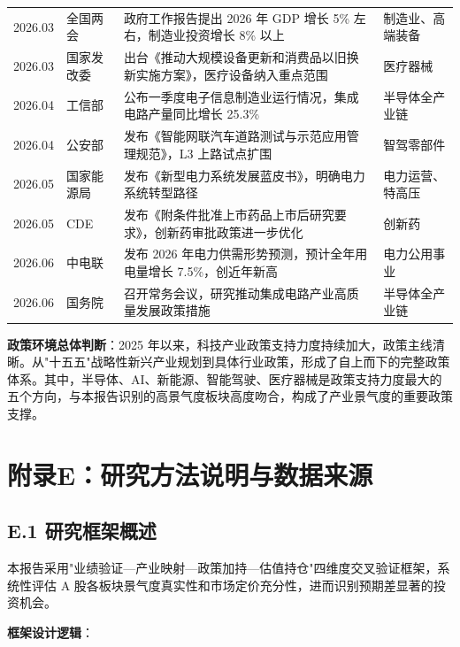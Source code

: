 \begin{exhibitbox}[表 D-1：重点产业政策与关键事件时间轴]
\begin{tabularx}{\textwidth}{@{}l l X l@{}}
2026.03 & 全国两会 & 政府工作报告提出 2026 年 GDP 增长 5\% 左右，制造业投资增长 8\% 以上 & 制造业、高端装备 \\
2026.03 & 国家发改委 & 出台《推动大规模设备更新和消费品以旧换新实施方案》，医疗设备纳入重点范围 & 医疗器械 \\
2026.04 & 工信部 & 公布一季度电子信息制造业运行情况，集成电路产量同比增长 25.3\% & 半导体全产业链 \\
2026.04 & 公安部 & 发布《智能网联汽车道路测试与示范应用管理规范》，L3 上路试点扩围 & 智驾零部件 \\
2026.05 & 国家能源局 & 发布《新型电力系统发展蓝皮书》，明确电力系统转型路径 & 电力运营、特高压 \\
2026.05 & CDE & 发布《附条件批准上市药品上市后研究要求》，创新药审批政策进一步优化 & 创新药 \\
2026.06 & 中电联 & 发布 2026 年电力供需形势预测，预计全年用电量增长 7.5\%，创近年新高 & 电力公用事业 \\
2026.06 & 国务院 & 召开常务会议，研究推动集成电路产业高质量发展政策措施 & 半导体全产业链 \\
\bottomrule
\end{tabularx}
\vspace{0.5em}
\end{exhibitbox}

\vspace{0.3em}

\textbf{政策环境总体判断}：2025 年以来，科技产业政策支持力度持续加大，政策主线清晰。从"十五五"战略性新兴产业规划到具体行业政策，形成了自上而下的完整政策体系。其中，半导体、AI、新能源、智能驾驶、医疗器械是政策支持力度最大的五个方向，与本报告识别的高景气度板块高度吻合，构成了产业景气度的重要政策支撑。

\section{附录E：研究方法说明与数据来源}

\subsection{E.1 研究框架概述}

本报告采用"业绩验证---产业映射---政策加持---估值持仓"四维度交叉验证框架，系统性评估 A 股各板块景气度真实性和市场定价充分性，进而识别预期差显著的投资机会。

\vspace{0.3em}

\textbf{框架设计逻辑}：

